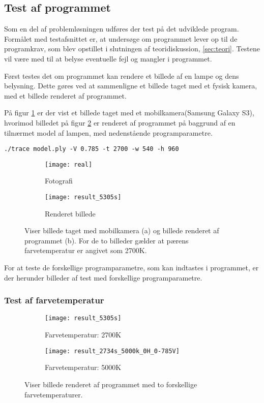 \subsection{Test af programmet}
\label{sec:test}

Som en del af problemløsningen udføres der test på det udviklede program. Formålet med testafsnittet er, at undersøge om programmet lever op til de programkrav, som blev opstillet i slutningen af teoridiskussion, \ref{sec:teori}. Testene vil være med til at belyse eventuelle fejl og mangler i programmet.

Først testes det om programmet kan rendere et billede af en lampe og dens belysning. Dette gøres ved at sammenligne et billede taget med et fysisk kamera, med et billede renderet af programmet.

På figur \ref{fig:real} er der vist et billede taget med et mobilkamera(Samsung Galaxy S3), hvorimod billedet på figur \ref{fig:fake} er renderet af programmet på baggrund af en tilnærmet model af lampen, med nedenstående programparametre.
\begin{lstlisting}
./trace model.ply -V 0.785 -t 2700 -w 540 -h 960
\end{lstlisting}

\begin{figure}[H]
\centering
\begin{subfigure}{.5\textwidth}
  \centering
  \texttt{[image: real]}
  \caption{Fotografi}
  \label{fig:real}
\end{subfigure}%
\begin{subfigure}{.5\textwidth}
  \centering
  \texttt{[image: result\_5305s]}
  \caption{Renderet billede}
  \label{fig:fake}
\end{subfigure}
\caption{Viser billede taget med mobilkamera (a) og billede renderet af programmet (b). For de to billeder gælder at pærens farvetemperatur er angivet som 2700K.}
\label{fig:test_real_fake}
\end{figure}

For at teste de forskellige programparametre, som kan indtastes i programmet, er der herunder billeder af test med forskellige programparametre.

\subsubsection{Test af farvetemperatur}
\begin{figure}[H]
\centering
\begin{subfigure}{.5\textwidth}
  \centering
  \texttt{[image: result\_5305s]}
  \caption{Farvetemperatur: 2700K}
  \label{fig:kelvin2700}
\end{subfigure}%
\begin{subfigure}{.5\textwidth}
  \centering
  \texttt{[image: result\_2734s\_5000k\_0H\_0-785V]}
  \caption{Farvetemperatur: 5000K}
  \label{fig:kelvin5000}
\end{subfigure}
\caption{Viser billede renderet af programmet med to forskellige farvetemperaturer.}
\label{fig:farvetemperatur}
\end{figure}

